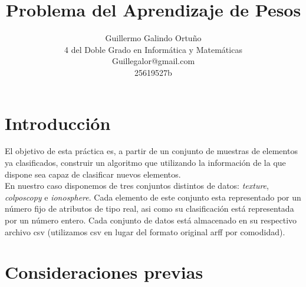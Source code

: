 \documentclass[size=a4, parskip=half, titlepage=false, toc=flat, toc=bib, 12pt]{scrartcl}
\begin{document}
\renewcommand{\proofname}{\normalfont\sffamily\bfseries\small DEMOSTRACIÓN}

\title{Problema del Aprendizaje de Pesos}
\subject{Metaheurísticas}
\author{Guillermo Galindo Ortuño\\
    4 del Doble Grado en Informática y Matemáticas\\
    Guillegalor@gmail.com\\
    25619527b}
\publishers{\vspace{2cm}\texttt{[image: UGR]}\vspace{1cm}}
\maketitle

\tableofcontents
\newpage

\section{Introducción}

El objetivo de esta práctica es, a partir de un conjunto de muestras de elementos ya clasificados, construir un algoritmo que utilizando la información de la que dispone sea capaz de clasificar nuevos elementos. \\

En nuestro caso disponemos de tres conjuntos distintos de datos: \textit{texture}, \textit{colposcopy} e \textit{ionosphere}. Cada elemento de este conjunto esta representado por un número fijo de atributos de tipo real, asi como su clasificación está representada por un número entero. Cada conjunto de datos está almacenado en su respectivo archivo csv (utilizamos csv en lugar del formato original arff por comodidad).

\newpage

\section{Consideraciones previas}
\end{document}
